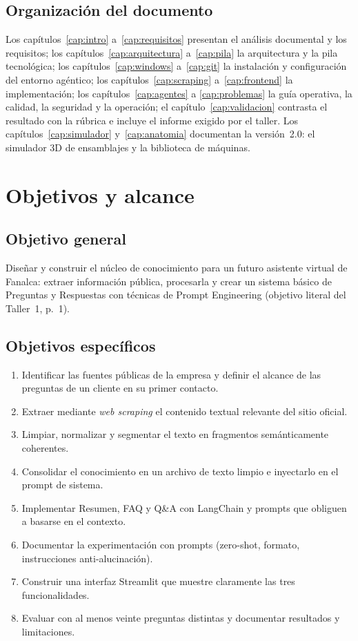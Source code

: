 \section{Organización del documento}
Los capítulos~\ref{cap:intro} a~\ref{cap:requisitos} presentan el análisis documental y los requisitos; los
capítulos~\ref{cap:arquitectura} a~\ref{cap:pila} la arquitectura y la pila tecnológica; los
capítulos~\ref{cap:windows} a~\ref{cap:git} la instalación y configuración del entorno agéntico; los
capítulos~\ref{cap:scraping} a~\ref{cap:frontend} la implementación; los capítulos~\ref{cap:agentes} a
\ref{cap:problemas} la guía operativa, la calidad, la seguridad y la operación; el capítulo~\ref{cap:validacion}
contrasta el resultado con la rúbrica e incluye el informe exigido por el taller. Los capítulos~\ref{cap:simulador}
y~\ref{cap:anatomia} documentan la versión~2.0: el simulador 3D de ensamblajes y la biblioteca de máquinas.

\chapter{Objetivos y alcance}\label{cap:objetivos}

\section{Objetivo general}
Diseñar y construir el núcleo de conocimiento para un futuro asistente virtual de Fanalca: extraer información
pública, procesarla y crear un sistema básico de Preguntas y Respuestas con técnicas de Prompt Engineering
(objetivo literal del Taller~1, p.~1).

\section{Objetivos específicos}
\begin{enumerate}[label=OE\arabic*.]
  \item Identificar las fuentes públicas de la empresa y definir el alcance de las preguntas de un cliente en
        su primer contacto.
  \item Extraer mediante \emph{web scraping} el contenido textual relevante del sitio oficial.
  \item Limpiar, normalizar y segmentar el texto en fragmentos semánticamente coherentes.
  \item Consolidar el conocimiento en un archivo de texto limpio e inyectarlo en el prompt de sistema.
  \item Implementar Resumen, FAQ y Q\&A con LangChain y prompts que obliguen a basarse en el contexto.
  \item Documentar la experimentación con prompts (zero-shot, formato, instrucciones anti-alucinación).
  \item Construir una interfaz Streamlit que muestre claramente las tres funcionalidades.
  \item Evaluar con al menos veinte preguntas distintas y documentar resultados y limitaciones.
\end{enumerate}

